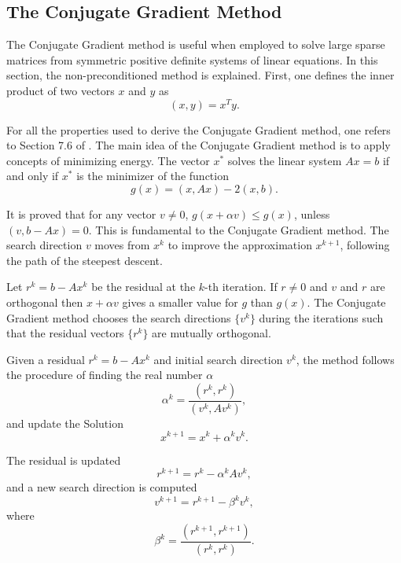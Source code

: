 \subsection{The Conjugate Gradient Method}
The Conjugate Gradient method is useful when employed to solve large sparse matrices from symmetric positive definite systems of linear equations. In this section, the non-preconditioned method is explained. First, one defines the inner product of two vectors $x$ and $y$ as
\begin{equation}
    (x,y) = x^Ty.
\end{equation}

For all the properties used to derive the Conjugate Gradient method, one refers to Section 7.6 of \cite{burden1997numerical}. 
The main idea of the Conjugate Gradient method is to apply concepts of minimizing energy. The vector $x^*$ solves the linear system $Ax = b$ if and only if $x^*$ is the minimizer of the function 
\begin{equation}
    g(x) = (x, Ax) - 2(x, b).
\end{equation}

It is proved that for any vector $v \neq 0$, $g(x + \alpha v) \leq g(x)$, unless $(v, b - Ax) = 0$. This is fundamental to the Conjugate Gradient method. The search direction $v$ moves from $x^k$ to improve the approximation $x^{k+1}$, following the path of the steepest descent. 

Let $r^k = b - Ax^k$ be the residual at the $k$-th iteration. If $r \neq 0$ and $v$ and $r$ are orthogonal then $x + \alpha v$ gives a smaller value for $g$ than $g(x)$. The Conjugate Gradient method chooses the search directions $\{v^k\}$ during the iterations such that the residual vectors $\{r^k\}$ are mutually orthogonal. 

Given a residual $r^k = b - Ax^k$ and initial search direction $v^k$, the method follows the procedure of finding the real number $\alpha$
\begin{equation}
    \alpha^k = \frac{(r^k, r^k)}{(v^k, Av^k)},
\end{equation}
and update the Solution
\begin{equation}
    x^{k+1} = x^k + \alpha^k v^k.
\end{equation}

The residual is updated 
\begin{equation}
    r^{k+1} = r^k - \alpha^k Av^k,
\end{equation}
and a new search direction is computed
\begin{equation}
    v^{k+1} = r^{k+1} - \beta^k v^k,
\end{equation}
where 
\begin{equation}
    \beta^k = \frac{(r^{k+1}, r^{k+1})}{(r^k, r^k)}.
\end{equation}
